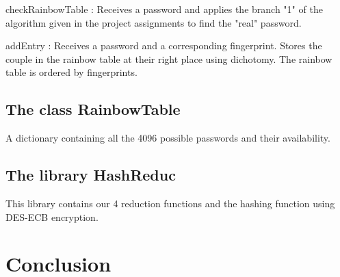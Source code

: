 \documentclass[11pt,a4paper]{article}
\begin{document}
\item[checkRainbowTable :] Receives a password and applies the branch "1" of the algorithm given in the project assignments to find the "real" password. \\

\item[addEntry :] Receives a password and a corresponding fingerprint. Stores the couple in the rainbow table at their right place using dichotomy. The rainbow table is ordered by fingerprints. \\

\subsection{The class RainbowTable}

A dictionary containing all the 4096 possible passwords and their availability. \\

\subsection{The library HashReduc}

This library contains our 4 reduction functions and the hashing function using DES-ECB encryption.

\newpage
\section{Conclusion}
\end{document}
